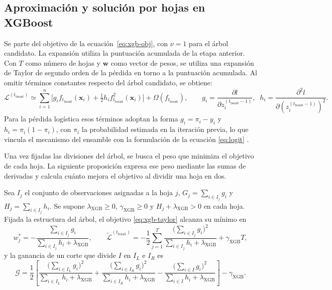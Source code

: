 \subsection{Aproximación y solución por hojas en XGBoost}\label{editorial:xgb}
Se parte del objetivo de la ecuación~\eqref{eq:xgb-obj}, con $\nu=1$ para el árbol candidato. La expansión utiliza la puntuación acumulada de la etapa anterior.
Con $T$ como número de hojas y $\mathbf{w}$ como vector de pesos, se utiliza una expansión de Taylor de segundo orden de la pérdida en torno a la puntuación acumulada. Al omitir términos constantes respecto del árbol candidato, se obtiene:
\begin{equation}\label{eq:xgb-taylor}
\mathcal{L}^{(t_{\mathrm{boost}})}\simeq\sum_{i=1}^{n}\Big[g_{i}f_{t_{\mathrm{boost}}}(\mathbf{x}_{i})+\tfrac{1}{2}h_{i}f_{t_{\mathrm{boost}}}^{2}(\mathbf{x}_{i})\Big]+\Omega(f_{t_{\mathrm{boost}}}),
\qquad
g_{i}=\frac{\partial l}{\partial z_i^{(t_{\mathrm{boost}}-1)}},\;\;
h_{i}=\frac{\partial^{2}l}{\partial(z_i^{(t_{\mathrm{boost}}-1)})^{2}}.
\end{equation}
Para la pérdida logística esos términos adoptan la forma $g_{i}=\pi_{i}-y_{i}$ y $h_{i}=\pi_{i}(1-\pi_{i})$, con $\pi_{i}$ la probabilidad estimada en la iteración previa, lo que vincula el mecanismo del ensamble con la formulación de la ecuación \eqref{eq:logit} \cite{chen2016}.

Una vez fijadas las divisiones del árbol, se busca el peso que minimiza el objetivo de cada hoja. La siguiente proposición expresa ese peso mediante las sumas de derivadas y calcula cuánto mejora el objetivo al dividir una hoja en dos.

\begin{proposicion}\label{prop:xgb}
Sea $I_{j}$ el conjunto de observaciones asignadas a la hoja $j$, $G_j=\sum_{i\in I_j}g_i$ y $H_j=\sum_{i\in I_j}h_i$. Se supone $\lambda_{\mathrm{XGB}}\geq0$, $\gamma_{\mathrm{XGB}}\geq0$ y $H_j+\lambda_{\mathrm{XGB}}>0$ en cada hoja. Fijada la estructura del árbol, el objetivo \eqref{eq:xgb-taylor} alcanza su mínimo en
\[
w_{j}^{\ast}=-\frac{\sum_{i\in I_{j}}g_{i}}{\sum_{i\in I_{j}}h_{i}+\lambda_{\mathrm{XGB}}},
\qquad
\tilde{\mathcal{L}}^{(t_{\mathrm{boost}})}=-\frac{1}{2}\sum_{j=1}^{T}\frac{\big(\sum_{i\in I_{j}}g_{i}\big)^{2}}{\sum_{i\in I_{j}}h_{i}+\lambda_{\mathrm{XGB}}}+\gamma_{\mathrm{XGB}} T,
\]
y la ganancia de un corte que divide $I$ en $I_{L}$ e $I_{R}$ es
\begin{equation}\label{eq:xgb-gain}
\mathcal{G}=\frac{1}{2}\left[
\frac{\big(\sum_{i\in I_{L}}g_{i}\big)^{2}}{\sum_{i\in I_{L}}h_{i}+\lambda_{\mathrm{XGB}}}
+\frac{\big(\sum_{i\in I_{R}}g_{i}\big)^{2}}{\sum_{i\in I_{R}}h_{i}+\lambda_{\mathrm{XGB}}}
-\frac{\big(\sum_{i\in I}g_{i}\big)^{2}}{\sum_{i\in I}h_{i}+\lambda_{\mathrm{XGB}}}
\right]-\gamma_{\mathrm{XGB}}.
\end{equation}
\end{proposicion}

